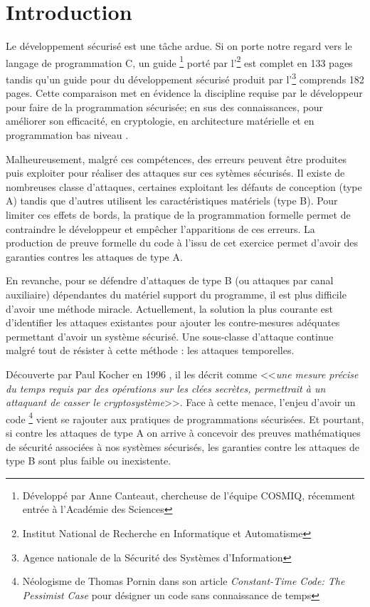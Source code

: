 \chapter*{Introduction}

Le développement sécurisé est une tâche ardue. Si on porte notre regard vers le langage de programmation C, un guide \cite{progC_guide}\footnote{Développé par Anne Canteaut, chercheuse de l'équipe COSMIQ, récemment entrée à l'Académie des Sciences} porté par l'\footnote{Institut National de Recherche en Informatique et Automatisme} est complet en 133 pages tandis qu'un guide pour du développement sécurisé\cite{anssi_guideForSecureprogramming} produit par l'\footnote{Agence nationale de la Sécurité des Systèmes d'Information} comprends 182 pages. Cette comparaison met en évidence la discipline requise par le développeur pour faire de la programmation sécurisée; en sus des connaissances, pour améliorer son efficacité, en cryptologie, en architecture matérielle et en programmation bas niveau .\medbreak

Malheureusement, malgré ces compétences, des erreurs peuvent être produites puis exploiter pour réaliser des attaques sur ces sytèmes sécurisés. Il existe de nombreuses classe d'attaques, certaines exploitant les défauts de conception (type A) tandis que d'autres utilisent les caractéristiques matériels (type B). Pour limiter ces effets de bords, la pratique de la programmation formelle permet de contraindre le développeur et empêcher l'apparitions de ces erreurs. La production de preuve formelle du code à l'issu de cet exercice permet d'avoir des garanties contres les attaques de type A.

En revanche, pour se défendre d'attaques de type B (ou attaques par canal auxiliaire) dépendantes du matériel support du programme, il est plus difficile d'avoir une méthode miracle. Actuellement, la solution la plus courante est d'identifier les attaques existantes pour ajouter les contre-mesures adéquates permettant d'avoir un système sécurisé. Une sous-classe d'attaque continue malgré tout de résister à cette méthode : les attaques temporelles.\medbreak

Découverte par Paul Kocher en 1996 \cite{crypto-1996-1469}, il les décrit comme <<\textit{une mesure précise du temps requis par des opérations sur les clées secrètes, permettrait à un attaquant de casser le cryptosystème}>>. Face à cette menace, l'enjeu d'avoir un code \textit{}\footnote{Néologisme de Thomas Pornin dans son article \textit{Constant-Time Code: The Pessimist Case} \cite{constantTimePornin} pour désigner un code sans connaissance de temps} vient se rajouter aux pratiques de programmations sécurisées. Et pourtant, si contre les attaques de type A on arrive à concevoir des preuves mathématiques de sécurité associées à nos systèmes sécurisés, les garanties contre les attaques de type B sont plus faible ou inexistente.\medbreak

